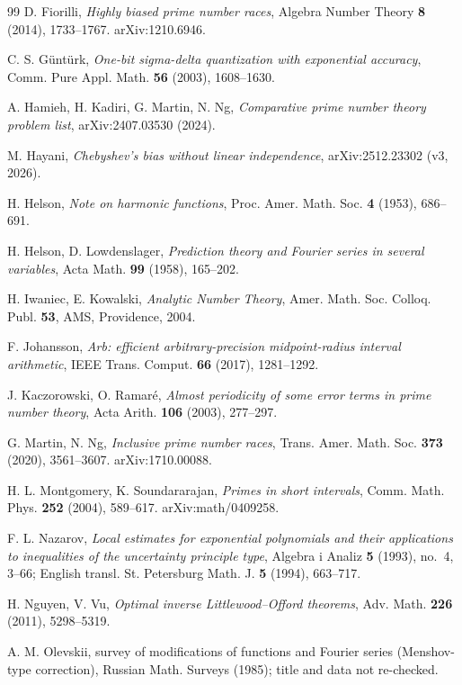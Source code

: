 \documentclass[11pt]{amsart}
\theoremstyle{definition}
\numberwithin{equation}{section}
\begin{document}
\begin{thebibliography}{99}
 D. Fiorilli, \emph{Highly biased prime number races}, Algebra Number Theory \textbf{8} (2014), 1733--1767. arXiv:1210.6946.

 C. S. G\"unt\"urk, \emph{One-bit sigma-delta quantization with exponential accuracy}, Comm. Pure Appl. Math. \textbf{56} (2003), 1608--1630.

 A. Hamieh, H. Kadiri, G. Martin, N. Ng, \emph{Comparative prime number theory problem list}, arXiv:2407.03530 (2024).

 M. Hayani, \emph{Chebyshev's bias without linear independence}, arXiv:2512.23302 (v3, 2026).

 H. Helson, \emph{Note on harmonic functions}, Proc. Amer. Math. Soc. \textbf{4} (1953), 686--691.

 H. Helson, D. Lowdenslager, \emph{Prediction theory and Fourier series in several variables}, Acta Math. \textbf{99} (1958), 165--202.

 H. Iwaniec, E. Kowalski, \emph{Analytic Number Theory}, Amer. Math. Soc. Colloq. Publ. \textbf{53}, AMS, Providence, 2004.

 F. Johansson, \emph{Arb: efficient arbitrary-precision midpoint-radius interval arithmetic}, IEEE Trans. Comput. \textbf{66} (2017), 1281--1292.

 J. Kaczorowski, O. Ramar\'e, \emph{Almost periodicity of some error terms in prime number theory}, Acta Arith. \textbf{106} (2003), 277--297.

 G. Martin, N. Ng, \emph{Inclusive prime number races}, Trans. Amer. Math. Soc. \textbf{373} (2020), 3561--3607. arXiv:1710.00088.

 H. L. Montgomery, K. Soundararajan, \emph{Primes in short intervals}, Comm. Math. Phys. \textbf{252} (2004), 589--617. arXiv:math/0409258.

 F. L. Nazarov, \emph{Local estimates for exponential polynomials and their applications to inequalities of the uncertainty principle type}, Algebra i Analiz \textbf{5} (1993), no.~4, 3--66; English transl. St. Petersburg Math. J. \textbf{5} (1994), 663--717.

 H. Nguyen, V. Vu, \emph{Optimal inverse Littlewood--Offord theorems}, Adv. Math. \textbf{226} (2011), 5298--5319.

 A. M. Olevskii, survey of modifications of functions and Fourier series (Menshov-type correction), Russian Math. Surveys (1985); title and data not re-checked.


\end{thebibliography}
\end{document}
